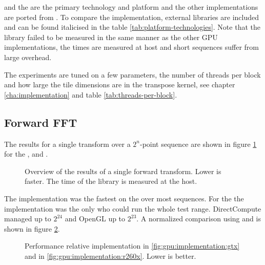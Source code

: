 {\CU} and the {\NVCARD} are the primary technology and platform and the other implementations are ported from {\CU}. To compare the implementation, external libraries are included and can be found italicised in the table \ref{tab:platform-technologies}. Note that the {\CLFFT} library failed to be measured in the same manner as the other GPU implementations, the times are measured at host and short sequences suffer from large overhead.

The experiments are tuned on a few parameters, the number of threads per block and how large the tile dimensions are in the transpose \gls{kernel}, see chapter \ref{cha:implementation} and table \ref{tab:threads-per-block}.

\subsection{Forward FFT}

The results for a single transform over a $2^{n}$-point sequence are shown in figure \ref{fig:gpu:overview} for the {\NVCARD}, {\AMDCARD} and {\INTELCPU}.

\begin{figure}[!htbp]
	\centering
	\subfloat[\NVCARD]{	
		
	}
	\vfill
	\subfloat[\AMDCARD]{
		
	}
	\caption{Overview of the results of a single forward transform. Lower is faster. The time of the {\CLFFT} library is measured at the host.}
	\label{fig:gpu:overview}
\end{figure}

The {\CU} implementation was the fastest on the {\NVCARD} over most sequences. For the {\AMDCARD} the {\OCL} implementation was the only who could run the whole test range. DirectCompute managed up to $2^{24}$ and OpenGL up to $2^{23}$. A normalized comparison using {\CU} and {\OCL} is shown in figure \ref{fig:gpu:implementation}.

\begin{figure}[!htbp]
	\centering
	\subfloat[\NVCARD\label{fig:gpu:implementation:gtx}]{	
		
	}
	\vfill
	\subfloat[\AMDCARD\label{fig:gpu:implementation:r260x}]{
		
	}	
	\caption{Performance relative {\CU} implementation in \ref{fig:gpu:implementation:gtx} and {\OCL} in \ref{fig:gpu:implementation:r260x}. Lower is better.}
	\label{fig:gpu:implementation}
\end{figure}

